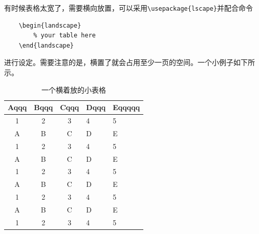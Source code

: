 有时候表格太宽了，需要横向放置，可以采用\lstinline|\usepackage{lscape}|并配合命令
\begin{verbatim}
	\begin{landscape}
		% your table here
	\end{landscape}
\end{verbatim}
进行设定。需要注意的是，横置了就会占用至少一页的空间。一个小例子如下所示。
	\begin{landscape}
	\begin{table}
		\centering
		\caption{一个横着放的小表格}
		\begin{tabular}{cccp{2cm}p{2cm}}
			\hline
			Aqqq & Bqqq & Cqqq & Dqqq & Eqqqqq \\
			\hline
			1 & 2 & 3 & 4 & 5\\
			A & B & C & D & E \\
			1 & 2 & 3 & 4 & 5\\
			A & B & C & D & E \\
			1 & 2 & 3 & 4 & 5\\
			A & B & C & D & E \\
			1 & 2 & 3 & 4 & 5\\
			A & B & C & D & E \\
			1 & 2 & 3 & 4 & 5\\
			\hline
		\end{tabular}
	\end{table}
\end{landscape}
